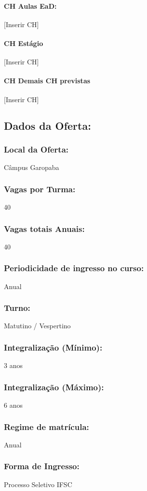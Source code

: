 \documentclass{ifsc-ppc}
\begin{document}
\paragraph{CH Aulas EaD:}
[Inserir CH]
\paragraph{CH Estágio}
[Inserir CH]
\paragraph{CH Demais CH previstas}
[Inserir CH]

\subsection{Dados da Oferta:}
\subsubsection{Local da Oferta:}
Câmpus Garopaba
\subsubsection{Vagas por Turma:}
40
\subsubsection{Vagas totais Anuais:}
40
\subsubsection{Periodicidade de ingresso no curso:}
Anual
\subsubsection{Turno:}
Matutino / Vespertino
\subsubsection{Integralização (Mínimo):}
3 anos
\subsubsection{Integralização (Máximo):}
6 anos
\subsubsection{Regime de matrícula:}
Anual
\subsubsection{Forma de Ingresso:}
Processo Seletivo IFSC
\end{document}
